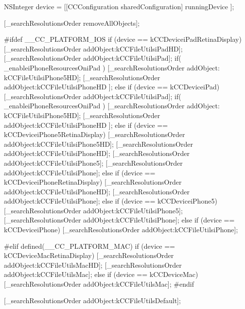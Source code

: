 \begin{DoxyCode}
{
        NSInteger device = [[CCConfiguration sharedConfiguration] runningDevice
      ];

        [_searchResolutionsOrder removeAllObjects];
        
#ifdef __CC_PLATFORM_IOS
        if (device == kCCDeviceiPadRetinaDisplay)
        {
                [_searchResolutionsOrder addObject:kCCFileUtilsiPadHD];
                [_searchResolutionsOrder addObject:kCCFileUtilsiPad];
                if( _enableiPhoneResourcesOniPad ) {
                        [_searchResolutionsOrder addObject:
      kCCFileUtilsiPhone5HD];
                        [_searchResolutionsOrder addObject:kCCFileUtilsiPhoneHD
      ];
                }
        }
        else if (device == kCCDeviceiPad)
        {
                [_searchResolutionsOrder addObject:kCCFileUtilsiPad];
                if( _enableiPhoneResourcesOniPad ) {
                        [_searchResolutionsOrder addObject:
      kCCFileUtilsiPhone5HD];
                        [_searchResolutionsOrder addObject:kCCFileUtilsiPhoneHD
      ];
                }
        }
        else if (device == kCCDeviceiPhone5RetinaDisplay)
        {
                [_searchResolutionsOrder addObject:kCCFileUtilsiPhone5HD];
                [_searchResolutionsOrder addObject:kCCFileUtilsiPhoneHD];
                [_searchResolutionsOrder addObject:kCCFileUtilsiPhone5];
                [_searchResolutionsOrder addObject:kCCFileUtilsiPhone];
        }
        else if (device == kCCDeviceiPhoneRetinaDisplay)
        {
                [_searchResolutionsOrder addObject:kCCFileUtilsiPhoneHD];
                [_searchResolutionsOrder addObject:kCCFileUtilsiPhone];
        }
        else if (device == kCCDeviceiPhone5)
        {
                [_searchResolutionsOrder addObject:kCCFileUtilsiPhone5];
                [_searchResolutionsOrder addObject:kCCFileUtilsiPhone];
        }
        else if (device == kCCDeviceiPhone)
        {
                [_searchResolutionsOrder addObject:kCCFileUtilsiPhone];
        }
        
#elif defined(__CC_PLATFORM_MAC)
        if (device == kCCDeviceMacRetinaDisplay)
        {
                [_searchResolutionsOrder addObject:kCCFileUtilsMacHD];
                [_searchResolutionsOrder addObject:kCCFileUtilsMac];
        }
        else if (device == kCCDeviceMac)
        {
                [_searchResolutionsOrder addObject:kCCFileUtilsMac];
        }
#endif  
        
        [_searchResolutionsOrder addObject:kCCFileUtilsDefault];
}
\end{DoxyCode}
